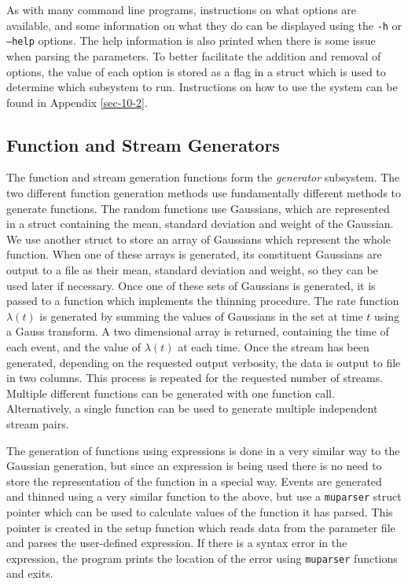 \documentclass[a4paper,11pt]{article}
\begin{document}
   As with many command line programs, instructions on what options are
   available, and some information on what they do can be displayed using the
   \texttt{-h} or \texttt{--help} options. The help information is also printed
   when there is some issue when parsing the parameters. To better facilitate
   the addition and removal of options, the value of each option is stored as a
   flag in a struct which is used to determine which subsystem to
   run. Instructions on how to use the system can be found in Appendix \ref{sec-10-2}.
\subsection{Function and Stream Generators}
\label{sec-6-6}

   The function and stream generation functions form the \emph{generator}
   subsystem. The two different function generation methods use fundamentally
   different methods to generate functions. The random functions use Gaussians,
   which are represented in a struct containing the mean, standard deviation and
   weight of the Gaussian. We use another struct to store an array of Gaussians
   which represent the whole function. When one of these arrays is generated,
   its constituent Gaussians are output to a file as their mean, standard
   deviation and weight, so they can be used later if necessary. Once one of
   these sets of Gaussians is generated, it is passed to a function which
   implements the thinning procedure. The rate function $\lambda(t)$ is
   generated by summing the values of Gaussians in the set at time $t$ using a
   Gauss transform. A two dimensional array is returned, containing the time of
   each event, and the value of $\lambda(t)$ at each time. Once the stream has
   been generated, depending on the requested output verbosity, the data is
   output to file in two columns. This process is repeated for the requested
   number of streams. Multiple different functions can be generated with one
   function call. Alternatively, a single function can be used to generate
   multiple independent stream pairs.

   The generation of functions using expressions is done in a very similar way
   to the Gaussian generation, but since an expression is being used there is no
   need to store the representation of the function in a special way. Events are
   generated and thinned using a very similar function to the above, but use a
   \texttt{muparser} struct pointer which can be used to calculate values of the
   function it has parsed. This pointer is created in the setup function which
   reads data from the parameter file and parses the user-defined expression. If
   there is a syntax error in the expression, the program prints the location of
   the error using \texttt{muparser} functions and exits.
\end{document}

